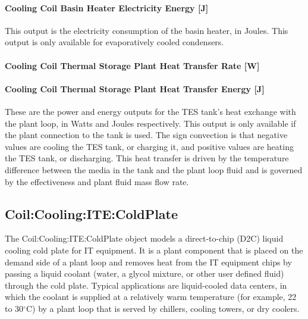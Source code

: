 \paragraph{Cooling Coil Basin Heater Electricity Energy {[}J{]}}\label{cooling-coil-basin-heater-electric-energy-j-2}

This output is the electricity consumption of the basin heater, in Joules. This output is only available for evaporatively cooled condensers.

\paragraph{Cooling Coil Thermal Storage Plant Heat Transfer Rate {[}W{]}}\label{cooling-coil-thermal-storage-plant-heat-transfer-rate-w}

\paragraph{Cooling Coil Thermal Storage Plant Heat Transfer Energy {[}J{]}}\label{cooling-coil-thermal-storage-plant-heat-transfer-energy-j}

These are the power and energy outputs for the TES tank's heat exchange with the plant loop, in Watts and Joules respectively. This output is only available if the plant connection to the tank is used. The sign convection is that negative values are cooling the TES tank, or charging it, and positive values are heating the TES tank, or discharging. This heat transfer is driven by the temperature difference between the media in the tank and the plant loop fluid and is governed by the effectiveness and plant fluid mass flow rate.

\subsection{Coil:Cooling:ITE:ColdPlate}\label{coilcoolingitecoldplate}

The Coil:Cooling:ITE:ColdPlate object models a direct-to-chip (D2C) liquid cooling cold plate for IT equipment. It is a plant component that is placed on the demand side of a plant loop and removes heat from the IT equipment chips by passing a liquid coolant (water, a glycol mixture, or other user defined fluid) through the cold plate. Typical applications are liquid-cooled data centers, in which the coolant is supplied at a relatively warm temperature (for example, 22 to 30$^\circ$C) by a plant loop that is served by chillers, cooling towers, or dry coolers.

